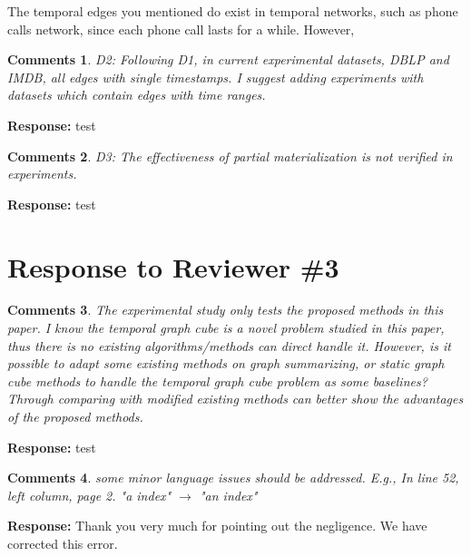 \documentclass{article}
\newtheorem{Comments}{\textbf{Comments}}
\begin{document}
The temporal edges you mentioned do exist in temporal networks, such as phone calls network, since each phone call lasts for a while. However,

\begin{Comments}
D2: Following D1, in current experimental datasets, DBLP and IMDB, all edges with single timestamps. I suggest adding experiments with datasets which contain edges with time ranges.
\end{Comments}
\noindent \textbf{Response:} test

\begin{Comments}
D3: The effectiveness of partial materialization is not verified in experiments.
\end{Comments}
\noindent \textbf{Response:} test

\section{Response to Reviewer \#3}
\setcounter{Comments}{0}
\begin{Comments}
The experimental study only tests the proposed methods in this paper. I know the temporal graph cube is a novel problem studied in this paper, thus there is no existing algorithms/methods can direct handle it. However, is it possible to adapt some existing methods on graph summarizing, or static graph cube methods to handle the temporal graph cube problem as some baselines? Through comparing with modified existing methods can better show the advantages of the proposed methods.
\end{Comments}
\noindent \textbf{Response:} test


\begin{Comments}
 some minor language issues should be addressed. E.g., In line 52, left column, page 2. "a index" $ \rightarrow $ "an index"
\end{Comments}
\noindent \textbf{Response:} Thank you very much for pointing out the negligence. We have corrected this error.
\end{document}
